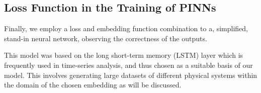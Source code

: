 \subsection{Loss Function in the Training of PINNs}

Finally, we employ a loss and embedding function combination to a, simplified, stand-in neural network, observing the correctness of the outputs.

This model was based on the long short-term memory (LSTM) layer \cite{hochreiterLongShortTermMemory1997} which is frequently used in time-series analysis, and thus chosen as a suitable basis of our model. This involves generating large datasets of different physical systems within the domain of the chosen embedding as will be discussed.
